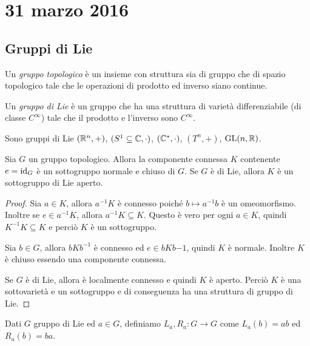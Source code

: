 \chapter{31 marzo 2016}

\section{Gruppi di Lie}

\begin{definition}
	Un \emph{gruppo topologico} è un insieme con struttura sia di gruppo che di spazio topologico tale che le operazioni di prodotto ed inverso siano continue.
\end{definition}

\begin{definition}
	Un \emph{gruppo di Lie} è un gruppo che ha una struttura di varietà differenziabile (di classe $C^\infty$) tale che il prodotto e l'inverso sono $C^\infty$.
\end{definition}

\begin{example}
	Sono gruppi di Lie $(\mathbb R^n,+)$, $(S^1\subseteq \mathbb C, \cdot)$, $(\mathbb C^*,\cdot)$, $(T^n, +)$, $\mathrm{GL}(n,\mathbb R)$.
\end{example}

\begin{proposition}
	Sia $G$ un gruppo topologico. Allora la componente connessa $K$ contenente $e=\mathrm{id}_G$ è un sottogruppo normale e chiuso di $G$. Se $G$ è di Lie, allora $K$ è un sottogruppo di Lie aperto.
\end{proposition}
\begin{proof}
	Sia $a\in K$, allora $a^{-1}K$ è connesso poiché $b\mapsto a^{-1}b$ è un omeomorfismo.
	Inoltre se $e\in a^{-1}K$, allora $a^{-1}K\subseteq K$. Questo è vero per ogni $a\in K$, quindi $K^{-1}K\subseteq K$ e perciò $K$ è un sottogruppo.
	
	Sia $b\in G$, allora $bKb^{-1}$ è connesso ed $e\in bKb{-1}$, quindi $K$ è normale. Inoltre $K$ è chiuso essendo una componente connessa.
	
	Se $G$ è di Lie, allora è localmente connesso e quindi $K$ è aperto. Perciò $K$ è una sottovarietà e un sottogruppo e di conseguenza ha una struttura di gruppo di Lie.
\end{proof}


\begin{definition}
	Dati $G$ gruppo di Lie ed $a\in G$, definiamo $L_a,R_a:G\to G$ come $L_a(b) = ab$ ed $R_a(b) = ba$.
\end{definition}

